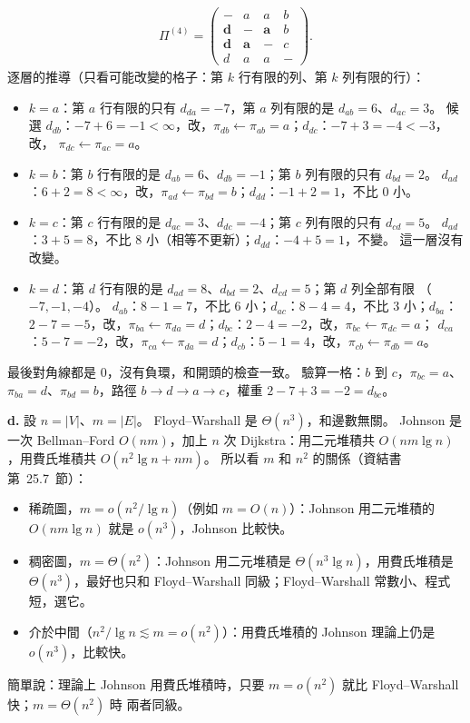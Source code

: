 \begin{pastsoln}
\begin{gather*}
\Pi^{(4)} = \begin{pmatrix} - & a & a & b \\ \mathbf{d} & - & \mathbf{a} & b \\ \mathbf{d} & \mathbf{a} & - & c \\ d & a & a & - \end{pmatrix}.
\end{gather*}
逐層的推導（只看可能改變的格子：第 $k$ 行有限的列、第 $k$ 列有限的行）：
\begin{itemize}
\item $k = a$：第 $a$ 行有限的只有 $d_{da} = -7$，第 $a$ 列有限的是 $d_{ab} = 6$、$d_{ac} = 3$。 候選
$d_{db}$：$-7 + 6 = -1 < \infty$，改，$\pi_{db} \gets \pi_{ab} = a$；$d_{dc}$：$-7 + 3 = -4 < -3$，改，
$\pi_{dc} \gets \pi_{ac} = a$。
\item $k = b$：第 $b$ 行有限的是 $d_{ab} = 6$、$d_{db} = -1$；第 $b$ 列有限的只有 $d_{bd} = 2$。
$d_{ad}$：$6 + 2 = 8 < \infty$，改，$\pi_{ad} \gets \pi_{bd} = b$；$d_{dd}$：$-1 + 2 = 1$，不比 $0$ 小。
\item $k = c$：第 $c$ 行有限的是 $d_{ac} = 3$、$d_{dc} = -4$；第 $c$ 列有限的只有 $d_{cd} = 5$。
$d_{ad}$：$3 + 5 = 8$，不比 $8$ 小（相等不更新）；$d_{dd}$：$-4 + 5 = 1$，不變。 這一層沒有改變。
\item $k = d$：第 $d$ 行有限的是 $d_{ad} = 8$、$d_{bd} = 2$、$d_{cd} = 5$；第 $d$ 列全部有限
（$-7, -1, -4$）。 $d_{ab}$：$8 - 1 = 7$，不比 $6$ 小；$d_{ac}$：$8 - 4 = 4$，不比 $3$ 小；$d_{ba}$：
$2 - 7 = -5$，改，$\pi_{ba} \gets \pi_{da} = d$；$d_{bc}$：$2 - 4 = -2$，改，$\pi_{bc} \gets \pi_{dc} = a$；
$d_{ca}$：$5 - 7 = -2$，改，$\pi_{ca} \gets \pi_{da} = d$；$d_{cb}$：$5 - 1 = 4$，改，$\pi_{cb} \gets
\pi_{db} = a$。
\end{itemize}
最後對角線都是 $0$，沒有負環，和開頭的檢查一致。 驗算一格：$b$ 到 $c$，$\pi_{bc} = a$、
$\pi_{ba} = d$、$\pi_{bd} = b$，路徑 $b \to d \to a \to c$，權重 $2 - 7 + 3 = -2 = d_{bc}$。

\textbf{d.} 設 $n = |V|$、$m = |E|$。 Floyd--Warshall 是 $\Theta(n^3)$，和邊數無關。 Johnson 是一次
Bellman--Ford $O(nm)$，加上 $n$ 次 Dijkstra：用二元堆積共 $O(nm \lg n)$，用費氏堆積共
$O(n^2 \lg n + nm)$。 所以看 $m$ 和 $n^2$ 的關係（資結書第~25.7~節）：
\begin{itemize}
\item 稀疏圖，$m = o(n^2 / \lg n)$（例如 $m = O(n)$）：Johnson 用二元堆積的 $O(nm \lg n)$ 就是
$o(n^3)$，Johnson 比較快。
\item 稠密圖，$m = \Theta(n^2)$：Johnson 用二元堆積是 $\Theta(n^3 \lg n)$，用費氏堆積是
$\Theta(n^3)$，最好也只和 Floyd--Warshall 同級；Floyd--Warshall 常數小、程式短，選它。
\item 介於中間（$n^2 / \lg n \lesssim m = o(n^2)$）：用費氏堆積的 Johnson 理論上仍是 $o(n^3)$，比較快。
\end{itemize}
簡單說：理論上 Johnson 用費氏堆積時，只要 $m = o(n^2)$ 就比 Floyd--Warshall 快；$m = \Theta(n^2)$ 時
兩者同級。
\end{pastsoln}
